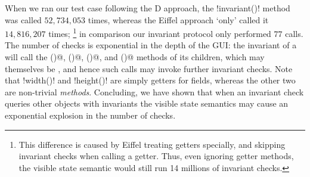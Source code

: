 When we ran our test case following the D approach, the \Q!invariant()! method was called $52,734,053$ times, whereas the Eiffel approach `only' called it $14,816,207$ times;%
\footnote{
This difference is caused by Eiffel treating getters specially, and skipping invariant checks when calling a getter.
Thus, even ignoring getter methods, the visible state semantic would still run 14 millions of invariant checks.
}
in comparison our invariant protocol only performed $77$ calls. The number of checks is exponential in the depth of the GUI: the invariant of a \Q@SafeMovable@ will call the \Q@width()@, \Q@height()@, \Q@left()@, and \Q@top()@ methods of its children, which may themselves be \Q@SafeMovable@s, and hence such calls may invoke further invariant checks. Note that \Q!width()! and \Q!height()! are simply getters for fields, whereas the other two are non-trivial \emph{methods}.
Concluding, we have shown that when an invariant check queries other objects with invariants the visible state semantics may cause an exponential explosion in the number of checks.





